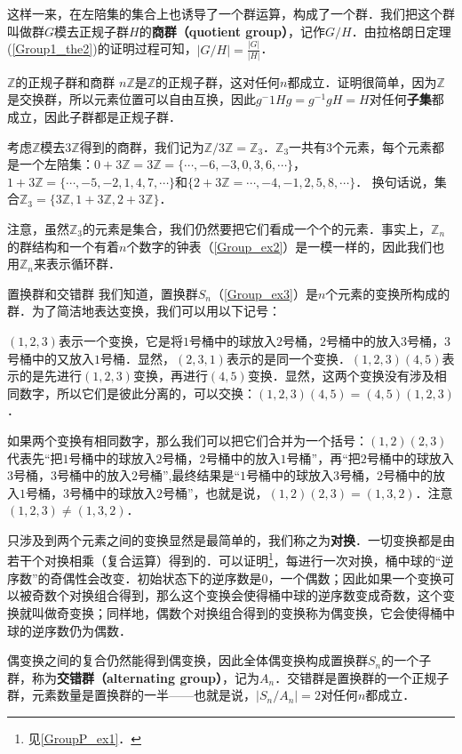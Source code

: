 这样一来，在左陪集的集合上也诱导了一个群运算，构成了一个群．我们把这个群叫做群$G$模去正规子群$H$的\textbf{商群（quotient group）}，记作$G/H$．由拉格朗日定理(\autoref{Group1_the2})的证明过程可知，$|G/H|=\frac{|G|}{|H|}$．

\begin{example}{$\mathbb{Z}$的正规子群和商群}\label{Group1_ex4}
$n\mathbb{Z}$是$\mathbb{Z}$的正规子群，这对任何$n$都成立．证明很简单，因为$\mathbb{Z}$是交换群，所以元素位置可以自由互换，因此$g^-{1}Hg=g^{-1}gH=H$对任何\textbf{子集}都成立，因此子群都是正规子群．

考虑$\mathbb{Z}$模去$3\mathbb{Z}$得到的商群，我们记为$\mathbb{Z}/3\mathbb{Z}=\mathbb{Z}_3$．$\mathbb{Z}_3$一共有$3$个元素，每个元素都是一个左陪集：$0+3\mathbb{Z}=3\mathbb{Z}=\{\cdots, -6, -3, 0, 3, 6, \cdots\}$，$1+3\mathbb{Z}=\{\cdots, -5, -2, 1, 4, 7, \cdots\}$和$\{2+3\mathbb{Z}=\cdots, -4, -1, 2, 5, 8, \cdots\}$． 换句话说，集合$\mathbb{Z}_3=\{3\mathbb{Z}, 1+3\mathbb{Z}, 2+3\mathbb{Z}\}$．

注意，虽然$\mathbb{Z}_3$的元素是集合，我们仍然要把它们看成一个个的元素．事实上，$\mathbb{Z}_n$的群结构和一个有着$n$个数字的钟表（\autoref{Group_ex2}）是一模一样的，因此我们也用$\mathbb{Z}_n$来表示循环群． 

\end{example}

\begin{example}{置换群和交错群}\label{Group1_ex5}
我们知道，置换群$S_n$（\autoref{Group_ex3}）是$n$个元素的变换所构成的群．为了简洁地表达变换，我们可以用以下记号：

$(1,2,3)$表示一个变换，它是将$1$号桶中的球放入$2$号桶，$2$号桶中的放入$3$号桶，$3$号桶中的又放入$1$号桶．显然，$(2,3,1)$表示的是同一个变换．$(1,2,3)(4,5)$表示的是先进行$(1,2,3)$变换，再进行$(4,5)$变换．显然，这两个变换没有涉及相同数字，所以它们是彼此分离的，可以交换：$(1,2,3)(4,5)=(4,5)(1,2,3)$．

如果两个变换有相同数字，那么我们可以把它们合并为一个括号：$(1,2)(2,3)$代表先“把$1$号桶中的球放入$2$号桶，$2$号桶中的放入$1$号桶”，再“把$2$号桶中的球放入$3$号桶，$3$号桶中的放入$2$号桶”,最终结果是“$1$号桶中的球放入$3$号桶，$2$号桶中的放入$1$号桶，$3$号桶中的球放入$2$号桶”，也就是说，$(1,2)(2,3)=(1,3,2)$．注意$(1,2,3)\not=(1,3,2)$．

只涉及到两个元素之间的变换显然是最简单的，我们称之为\textbf{对换}．一切变换都是由若干个对换相乘（复合运算）得到的．可以证明\footnote{见\autoref{GroupP_ex1}．}，每进行一次对换，桶中球的“逆序数”的奇偶性会改变．初始状态下的逆序数是$0$，一个偶数；因此如果一个变换可以被奇数个对换组合得到，那么这个变换会使得桶中球的逆序数变成奇数，这个变换就叫做奇变换；同样地，偶数个对换组合得到的变换称为偶变换，它会使得桶中球的逆序数仍为偶数．

偶变换之间的复合仍然能得到偶变换，因此全体偶变换构成置换群$S_n$的一个子群，称为\textbf{交错群（alternating group）}，记为$A_n$．交错群是置换群的一个正规子群，元素数量是置换群的一半——也就是说，$|S_n/A_n|=2$对任何$n$都成立．


\end{example}

